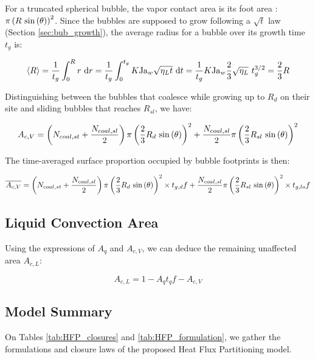 For a truncated spherical bubble, the vapor contact area is its foot area : $\pi  \left( R~\mathrm{sin}\left( \theta \right) \right)^{2}$. Since the bubbles are supposed to grow following a $\sqrt{t}$ law (Section \ref{sec:bub_growth}), the average radius for a bubble over its growth time $t_{g}$ is:

\begin{equation}
\left<R\right> = \frac{1}{t_{g}}\int_{0}^{R}r\ \mathrm{d}r = \frac{1}{t_{g}} \int_{0}^{t_{g}} K\mathrm{Ja}_{w}\sqrt{\eta_{L}t}~\mathrm{d}t = \frac{1}{t_{g}} K\mathrm{Ja}_{w} \frac{2}{3}\sqrt{\eta_{L}}~t_{g}^{3/2} = \frac{2}{3}R
\end{equation}

Distinguishing between the bubbles that coalesce while growing up to $R_{d}$ on their site and sliding bubbles that reaches $R_{sl}$, we have:

\begin{equation}
A_{c,V} = \parth{N_{coal,st} + \dfrac{N_{coal,sl}}{2}}\pi \parth{\dfrac{2}{3}R_{d}\ \sin{\theta}}^{2} + \dfrac{N_{coal,sl}}{2}\pi \parth{\dfrac{2}{3}R_{sl}\ \sin{\theta}}^{2}
\end{equation}

The time-averaged surface proportion occupied by bubble footprints is then:

\begin{equation}
\overline{A_{c,V}} =  \parth{N_{coal,st} + \dfrac{N_{coal,sl}}{2}}\pi \parth{\dfrac{2}{3}R_{d}\ \sin{\theta}}^{2} \times t_{g,d}f + \dfrac{N_{coal,sl}}{2}\pi \parth{\dfrac{2}{3}R_{sl}\ \sin{\theta}}^{2} \times t_{g,lo} f
\end{equation}


\subsection{Liquid Convection Area}

Using the expressions of $A_{q}$ and $A_{c,V}$, we can deduce the remaining unaffected area $A_{c,L}$:

\begin{equation}
A_{c,L} = 1 - A_{q}t_{q}f - {A_{c,V}}
\end{equation}

\subsection{Model Summary}

On Tables \ref{tab:HFP_closures} and \ref{tab:HFP_formulation}, we gather the formulations and closure laws of the proposed Heat Flux Partitioning model.

